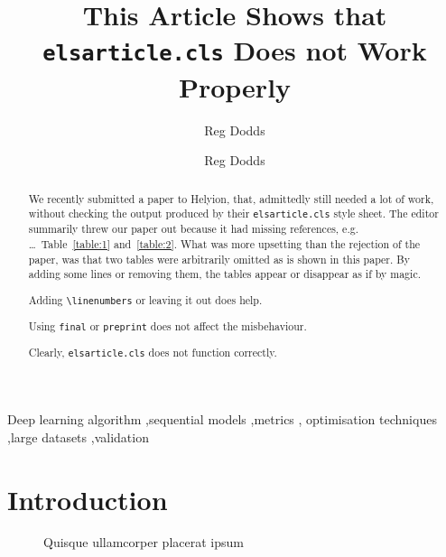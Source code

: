 \documentclass[preprint,3p,times,twocolumn]{elsarticle}  %
\begin{document}
\begin{frontmatter}
\title{This Article Shows that \texttt{elsarticle.cls} Does not Work Properly}
\ifpeerreview
\author{Reg Dodds}
\address{Department of Computer Science, University of the Western Cape, South Africa}
\else
\author{Reg Dodds}
\address{Department of Computer Science, University of the Western Cape, South Africa}
\fi
{}

\begin{abstract}
We recently submitted a paper to Helyion, that, admittedly still needed 
a lot of work, without checking the output produced by their \texttt{elsarticle.cls}
 style sheet.  The editor summarily threw our paper out because it had 
missing references, e.g. \ldots\ Table~\ref{table:1} and~\ref{table:2}. 
 What was more upsetting than the rejection of the paper, was that two tables 
were arbitrarily omitted as is shown in this paper.  By adding some lines 
or removing them, the tables appear or disappear as if by magic.  

Adding \verb!\linenumbers! or leaving it out does help.

Using \verb!final! or \verb!preprint! does not affect the misbehaviour.

Clearly, \verb!elsarticle.cls! does not function correctly.

\lipsum[1]
\end{abstract}
\begin{keyword}
Deep learning algorithm \sep sequential models \sep metrics \sep
optimisation techniques \sep large datasets \sep validation
\end{keyword}
\end{frontmatter}
\linenumbers
\section{Introduction}\label{sec:intro}
\begin{figure}%
%
\centering
{}
\caption{Quisque ullamcorper placerat ipsum}\label{fig:1}
\end{figure}
\lipsum[3-5]
\end{document}
